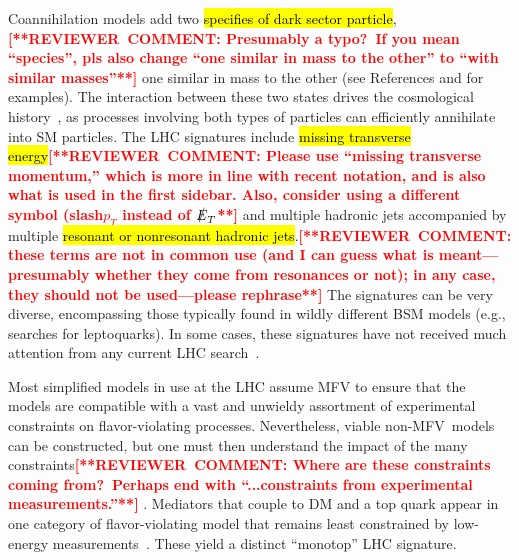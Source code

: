 \documentclass{ar-1col}
\newcommand{\MET}{\ensuremath{\slashed{E}_T}\xspace}
\begin{document}
{Coannihilation} models add two \hl{specifies of dark sector
particle},\textbf{\textcolor{red}{[**REVIEWER\ COMMENT: Presumably a typo?\ If you mean ``species'', pls also change ``one similar in mass to the other'' to ``with similar masses''**]}} one similar in mass to the other (see References  and  for examples). The interaction
between these two states drives the cosmological
history~\cite{Ellis:1999mm}, as processes involving both types of
particles can efficiently annihilate into SM particles. The LHC
signatures include \hl{missing transverse energy}\textbf{\textcolor{red}{[**REVIEWER\ COMMENT: Please use ``missing transverse momentum,'' which is more in line with recent notation, and is also what is used in the first sidebar. Also, consider using a different symbol (slash${p_T}$ instead of \MET**]}} and multiple hadronic
jets accompanied by multiple \hl{resonant or nonresonant hadronic
jets}.\textbf{\textcolor{red}{[**REVIEWER\ COMMENT: these terms are not in common use (and I can guess what is meant---presumably whether they come from resonances or not); in any case, they should not be used---please rephrase**]}} The signatures can be very diverse, encompassing those typically
found in wildly different BSM models (e.g., searches for
leptoquarks). In some cases, these signatures have not received much attention from any
current LHC search~\cite{Buschmann:2016hkc}.

Most simplified models in use at the LHC assume MFV to ensure that
the models are compatible with a vast and unwieldy assortment of
experimental constraints on flavor-violating processes.
Nevertheless, viable non-MFV\ models can be constructed, but one must then understand the impact of the
many constraints\textbf{\textcolor{red}{[**REVIEWER\ COMMENT: Where are these constraints coming from?\ Perhaps end with ``...constraints from experimental measurements.''**]}} \cite{Blanke:2017tnb}. Mediators that couple to
DM and a top quark appear in one category of flavor-violating
model that remains least constrained by low-energy
measurements~\cite{Boucheneb:2014wza}. These yield a distinct
``monotop'' LHC signature.
\end{document}
